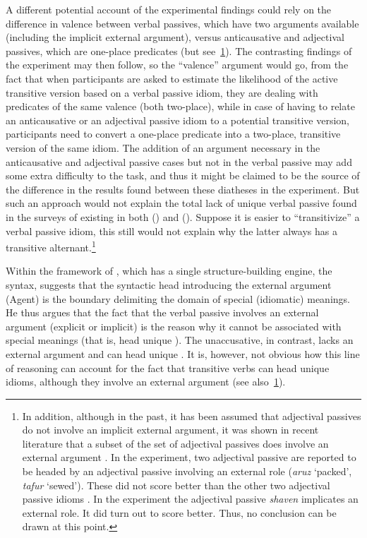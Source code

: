 \documentclass[output=paper]{langsci/langscibook}
\begin{document}
A different potential account of the experimental findings could rely on the
difference in valence between verbal passives, which have two arguments
available (including the implicit external argument), versus anticausative and
adjectival passives, which are one-place predicates (but see~\cref{fn:20.16}). The
contrasting findings of the experiment may then follow, so the ``valence''
argument would go, from the fact that when participants are asked to estimate
the likelihood of the active transitive version based on a verbal passive
idiom, they are dealing with predicates of the same valence (both two-place),
while in case of having to relate an anticausative or an adjectival passive
idiom to a potential transitive version, participants need to convert a
one-place predicate into a two-place, transitive version of the same idiom. The
addition of an argument necessary in the anticausative and adjectival passive
cases but not in the verbal passive may add some extra difficulty to the task,
and thus it might be claimed to be the source of the difference in the results
found between these diatheses in the experiment. But such an approach would not
explain the total lack of unique verbal passive  found in the surveys of
existing  in both  () and 
(\citealt{HorSil2009}). Suppose it is easier to “transitivize” a verbal passive
idiom, this still would not explain why the latter always has a transitive
alternant.\footnote{In addition, although in the past, it has been assumed that
    adjectival passives do not involve an implicit external argument, it was
    shown in recent literature that a subset of the set of adjectival passives
    does involve an external argument
    \parencite{Anagnostopoulou2003,GehMar2014,McIntyre2013,Meltzer-Asscher2011}.
    In the  experiment, two adjectival passive  are reported
    to be headed by an adjectival passive involving an external role
    (\emph{aruz} ‘packed’, \emph{tafur} ‘sewed’). These  did not
        score better than the other two adjectival passive idioms
        \parencite{SilHorKluWex2018}. In the  experiment the adjectival
passive \emph{shaven} implicates an external role. It did turn out to score
better. Thus, no conclusion can be drawn at this point.\label{fn:20.16}}

Within the framework of , which has a single
struc\-ture-build\-ing engine, the syntax, \citet{Marantz1997} suggests that the
syntactic head introducing the external argument (Agent) is the boundary
delimiting the domain of special (idiomatic) meanings. He thus argues that the
fact that the verbal passive involves an external argument (explicit or
implicit) is the reason why it cannot be associated with special meanings (that
is, head unique ). The unaccusative, in
contrast, lacks an external argument and can head unique . It is,
however, not obvious how this line of reasoning can account for the fact that
transitive verbs can head unique idioms, although they involve an external
argument (see also~\cref{fn:20.16}).\largerpage[2]
\end{document}
